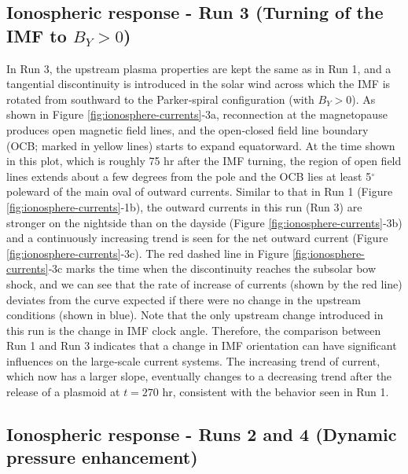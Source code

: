 \subsection{Ionospheric response - Run 3 (Turning of the IMF to \texorpdfstring{$B_Y > 0$}{By>0}) }

In Run 3, the upstream plasma properties are kept the same as in Run 1, and a tangential discontinuity is introduced in the solar wind across which the IMF is rotated from southward to the Parker‐spiral configuration (with $B_Y > 0$). As shown in Figure \ref{fig:ionosphere-currents}‐3a, reconnection at the magnetopause produces open magnetic field lines, and the open‐closed field line boundary (OCB; marked in yellow lines) starts to expand equatorward. At the time shown in this plot, which is roughly 75 hr after the IMF turning, the region of open field lines extends about a few degrees from the pole and the OCB lies at least 5$^\circ$ poleward of the main oval of outward currents. Similar to that in Run 1 (Figure \ref{fig:ionosphere-currents}‐1b), the outward currents in this run (Run 3) are stronger on the nightside than on the dayside (Figure \ref{fig:ionosphere-currents}‐3b) and a continuously increasing trend is seen for the net outward current (Figure \ref{fig:ionosphere-currents}‐3c). The red dashed line in Figure \ref{fig:ionosphere-currents}‐3c marks the time when the discontinuity reaches the subsolar bow shock, and we can see that the rate of increase of currents (shown by the red line) deviates from the curve expected if there were no change in the upstream conditions (shown in blue). Note that the only upstream change introduced in this run is the change in IMF clock angle. Therefore, the comparison between Run 1 and Run 3 indicates that a change in IMF orientation can have significant influences on the large‐scale current systems. The increasing trend of current, which now has a larger slope, eventually changes to a decreasing trend after the release of a plasmoid at $t = 270$ hr, consistent with the behavior seen in Run 1. 

\subsection{Ionospheric response - Runs 2 and 4 (Dynamic pressure enhancement)}

